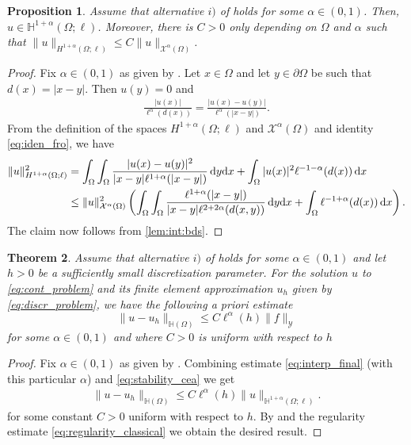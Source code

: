 \documentclass[10 pt]{article}
\newtheorem{theorem}{Theorem}[section]
\newtheorem{proposition}[theorem]{Proposition}
\numberwithin{equation}{section}
\def\d{\textnormal{d}}
\begin{document}
\begin{proposition}\label{prop:more_regularity}
Assume that alternative $i)$ of  holds for some $\alpha\in(0,1)$. Then, $u\in \mathbb H^{1+\alpha}(\Omega;\ell)$. Moreover, there is $C>0$ only depending on $\Omega$ and $\alpha$ such that $\|u\|_{H^{1+\alpha}(\Omega;\ell)}\leq C\|u\|_{\mathcal X^{\alpha}(\Omega)}$.
\end{proposition}
%
\begin{proof}
Fix $\alpha\in(0,1)$ as given by . Let $x\in \Omega$ and let $y\in\partial \Omega$ be such that $d(x)=|x-y|$. Then $u(y)=0$ and 
%
\begin{align}\label{eq:iden_fro}
    \frac{|u(x)|}{\ell^{\alpha}(d(x))}=\frac{|u(x)-u(y)|}{\ell^{\alpha}(|x-y|)}.
\end{align}
%
From the definition of the spaces $H^{1+\alpha}(\Omega;\ell)$ and $\mathcal X^\alpha(\Omega)$ and identity \eqref{eq:iden_fro}, we have
%
\begin{align}\notag
    \|u\|^2_{H^{1+\alpha}(\Omega;\ell)}&=\int_{\Omega}\int_{\Omega}\frac{|u(x)-u(y)|^2}{|x-y|\ell^{1+\alpha}(|x-y|)}\, \d{y} \d{x}+\int_{\Omega}|u(x)|^2\ell^{-1-\alpha}(d(x))\,\d{x} \\
    &\leq \|u\|^2_{\mathcal X^{\alpha}(\Omega)}\left(\int_{\Omega}\int_{\Omega}\frac{\ell^{1+\alpha}(|x-y|)}{|x-y|\ell^{2+2\alpha}(d(x,y))}\,\d{y}\d{x}+ \int_{\Omega}\ell^{-1+\alpha}(d(x))\,\d{x}\right).\label{a6}
\end{align}
%
The claim now follows from \eqref{lem:int:bds}.
\end{proof}
%

\begin{theorem}\label{thm:main-thm proof}
    Assume that alternative $i)$ of  holds for some $\alpha\in(0,1)$ and let $h>0$ be a sufficiently small discretization parameter. For the solution $u$ to \eqref{eq:cont_problem} and its finite element approximation $u_h$ given by \eqref{eq:discr_problem}, we have the following a priori estimate
    \begin{equation}
        \|u-u_h\|_{\mathbb H(\Omega)}\leq C\ell^{\alpha}(h)\|f\|_{\mathcal Y}
    \end{equation}
    for some $\alpha\in(0,1)$ and where $C>0$ is uniform with respect to $h$ 
\end{theorem}

\begin{proof}
Fix $\alpha\in(0,1)$ as given by . Combining estimate \eqref{eq:interp_final} (with this particular $\alpha$) and \eqref{eq:stability_cea} we get
%
\begin{align}
    \|u-u_h\|_{\mathbb H(\Omega)}\leq C\ell^{\alpha}(h)\|u\|_{\mathbb{H}^{1+\alpha}(\Omega;\ell)}.
\end{align}
%
for some constant $C>0$ uniform with respect to $h$. By  and the regularity estimate \eqref{eq:regularity_classical} we obtain the desired result.
\end{proof}
\end{document}

